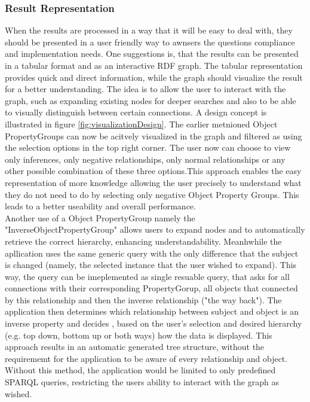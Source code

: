 \documentclass[
  a4paper,  %
  twoside,  %
  bibliography=totoc,
  headsepline,
  cleardoublepage=empty,
  parskip=half,
  draft=false
]{scrbook}
\begin{document}
\subsubsection{Result Representation}\label{sec:resultRepresentation}
When the results are processed in a way that it will be easy to deal with, they should be presented in a user friendly way to awnsers the questions compliance and implementation needs. One suggestions is, that the results can be presented in a tabular format and as an interactive RDF graph. The tabular representation  provides quick and direct information, while the graph should visualize the result for a better understanding. The idea is to allow the user to interact with the graph, such as expanding existing nodes for deeper searches and also to be able to visually distinguish between certain connections. A design concept is illustrated in figure \ref{fig:visualizationDesign}. The earlier metnioned Object PropertyGroups can now be acitvely visualized in the graph and filtered as using the selection options in the top right corner. The user now can choose to view only inferences, only negative relationships, only normal relationships or any other possible combination of these three options.This approach enables the easy representation of more knowledge allowing the user precisely to understand what they do not need to do by selecting only negative Object Property Groups. This leads to a better useability and overall performance. \\

Another use of a Object PropertyGroup namely the "InverseObjectPropertyGroup" allows users to expand nodes and to automatically retrieve the correct hierarchy, enhancing understandability. Meanhwhile the apllication uses the same generic query with the only difference that the subject is changed (namely, the selected instance that the user wished to expand). This way, the query can be imeplemented as single resuable query, that asks for all connections with their corresponding PropertyGorup, all objects that connected by this relationship and then the inverse relationship ("the way back"). The application then determines which relationship between subject and object is an inverse property and decides , based on the user's selection and desired hierarchy (e.g. top down, bottom up or both ways) how the data is displayed. This approach results in an automatic generated tree structure, without the requirememt for the application to be aware of every relationship and object. Without this method, the application would be limited to only predefined SPARQL queries, restricting the users ability to interact with the graph as wished.\\
\end{document}
